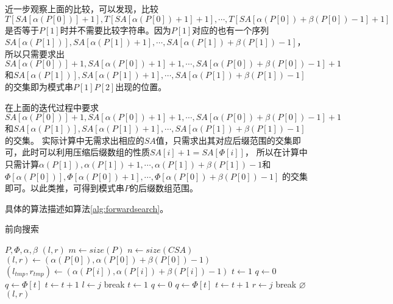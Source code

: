 近一步观察上面的比较，可以发现，比较$T[SA[\alpha(P[0])]+1],T[SA[\alpha(P[0])+1]+1],\cdots ,T[SA[\alpha(P[0])+\beta(P[0])-1]+1]$
是否等于$P[1]$时并不需要比较字符串。因为$P[1]$对应的也有一个序列$SA[\alpha(P[1])],SA[\alpha(P[1])+1],\cdots ,SA[\alpha(P[1])+\beta(P[1])-1]$，所以只需要求出
$SA[\alpha(P[0])]+1,SA[\alpha(P[0])+1]+1,\cdots ,SA[\alpha(P[0])+\beta(P[0])-1]+1$和$SA[\alpha(P[1])],SA[\alpha(P[1])+1],\cdots ,SA[\alpha(P[1])+\beta(P[1])-1]$
的交集即为模式串$P[1]P[2]$出现的位置。

在上面的迭代过程中要求$SA[\alpha(P[0])]+1,SA[\alpha(P[0])+1]+1,\cdots ,SA[\alpha(P[0])+\beta(P[0])-1]+1$和$SA[\alpha(P[1])],SA[\alpha(P[1])+1],\cdots ,SA[\alpha(P[1])+\beta(P[1])-1]$的交集。
实际计算中无需求出相应的$SA$值，只需求出其对应后缀范围的交集即可，此时可以利用压缩后缀数组的性质$SA[i]+1=SA[\Phi[i]]$，
所以在计算中只需计算$\alpha(P[1]),\alpha(P[1])+1,\cdots , \alpha(P[1])+\beta(P[1])-1$和$\Phi[\alpha(P[0])],\Phi[\alpha(P[0])+1],\cdots , \Phi[\alpha(P[0])+\beta(P[0])-1]$
的交集即可。以此类推，可得到模式串$P$的后缀数组范围。

具体的算法描述如算法\ref{alg:forwardsearch}。

\begin{algorithm}
    \caption{前向搜索}
    \label{alg:forwardsearch}
    \begin{algorithmic}[1]
        \Require $P,\Phi,\alpha,\beta$
        \Ensure $(l,r)$
        \State $m \gets size(P)$
        \State $n \gets size(CSA)$
        \State $(l,r) \gets (\alpha(P[0]),\alpha(P[0])+\beta(P[0])-1)$
            \State $(l_{tmp},r_{tmp}) \gets (\alpha(P[i]),\alpha(P[i])+\beta(P[i])-1)$
		\State $t \gets 1$
		\State $q \gets 0 $
		     \State $q \gets \Phi[t]$
		     \State $t \gets t+1$
		\EndWhile
                \State $l\gets j$
                \State break
            \EndIf
            \EndFor
		\State $t \gets 1$
		\State $q \gets 0 $
		     \State $q \gets \Phi[t]$
		     \State $t \gets t+1$
		\EndWhile
                \State $r\gets j$
                \State break
            \EndIf
            \EndFor
                \State \Return $\varnothing$
            \EndIf
        \EndFor
        \State \Return $(l,r)$
        \EndFunction
    \end{algorithmic}
\end{algorithm}

